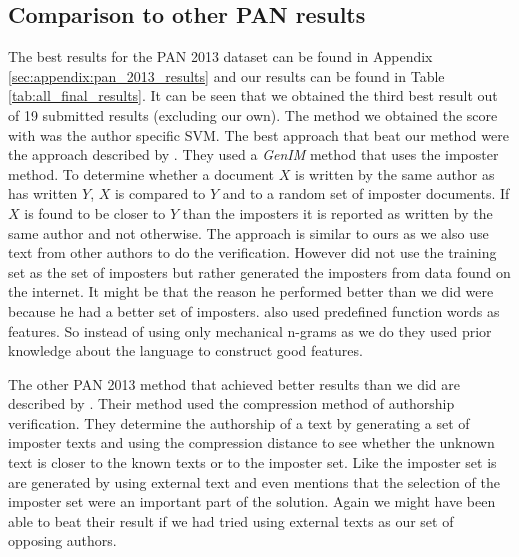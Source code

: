\subsection{Comparison to other PAN results}
The best results for the PAN 2013 dataset can be found in Appendix
\ref{sec:appendix:pan_2013_results} and our results can be found in Table
\ref{tab:all_final_results}. It can be seen that we obtained the third best
result out of 19 submitted results (excluding our own). The method we obtained
the score with was the author specific SVM. The best approach that beat
our method were the approach described by \cite{seidman:2013}. They used a
\textit{GenIM} method that uses the imposter method. To determine whether a
document $X$ is written by the same author as has written $Y$, $X$ is compared
to $Y$ and to a random set of imposter documents. If $X$ is found to be closer
to $Y$ than the imposters it is reported as written by the same author and not otherwise. The approach is similar to ours as we also use text from other
authors to do the verification. However \cite{seidman:2013} did not use the
training set as the set of imposters but rather generated the imposters from
data found on the internet. It might be that the reason he performed better than
we did were because he had a better set of imposters. \cite{seidman:2013} also
used predefined function words as features. So instead of using only mechanical
n-grams as we do they used prior knowledge about the language to construct good
features.

The other PAN 2013 method that achieved better results than we did are described
by \cite{veenman:2013}. Their method used the compression method of authorship
verification. They determine the authorship of a text by generating a set of
imposter texts and using the compression distance to see whether the unknown
text is closer to the known texts or to the imposter set. Like
\cite{seidman:2013} the imposter set is are generated by using external text and
\cite{veenman:2013} even mentions that the selection of the imposter set were an
important part of the solution. Again we might have been able to beat their
result if we had tried using external texts as our set of opposing authors.


